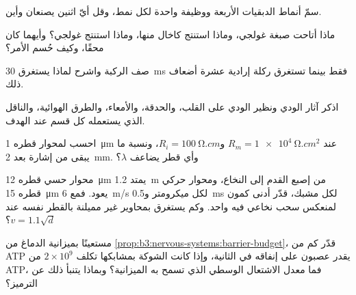 \begin{exercise}[$\star$]\label{exo:b3:nervous-systems:1}
سمّ أنماط الدبقيات الأربعة ووظيفة واحدة لكل نمط، وقل أيّ
اثنين يصنعان  وأين.
\end{exercise}

\begin{exercise}[$\star$]\label{exo:b3:nervous-systems:2}
ماذا أتاحت صبغة غولجي، وماذا استنتج كاخال منها، وماذا استنتج
غولجي؟ وأيهما كان محقًا، وكيف حُسم الأمر؟
\end{exercise}

\begin{exercise}[$\star$]\label{exo:b3:nervous-systems:3}
صف  الركبة واشرح لماذا يستغرق \qty{30}{ms} فقط
بينما تستغرق ركلة إرادية عشرة أضعاف ذلك.
\end{exercise}

\begin{exercise}[$\star$]\label{exo:b3:nervous-systems:4}
اذكر آثار الودي ونظير الودي على القلب، والحدقة، والأمعاء،
والطرق الهوائية، والناقل الذي يستعمله كل قسم عند الهدف.
\end{exercise}

\begin{exercise}[$\star\star$]\label{exo:b3:nervous-systems:5}
احسب  لمحوار قطره \qty{1}{\micro m} عند $R_{m}
= \qty{1e4}{\ohm.cm^2}$ و$R_{i} = \qty{100}{\ohm.cm}$، ونسبة
ما يبقى من إشارة بعد \qty{2}{mm}. وأي قطر يضاعف $\lambda$؟
\end{exercise}

\begin{exercise}[$\star\star$]\label{exo:b3:nervous-systems:6}
محوار حسي قطره \qty{12}{\micro m} يمتد \qty{1.2}{m} من إصبع
القدم إلى النخاع، ومحوار حركي قطره \qty{15}{\micro m} يعود.
فمع \qty{6}{m/s} لكل ميكرومتر و\qty{0.5}{ms} لكل مشبك، قدّر
أدنى كمون لمنعكس سحب نخاعي فيه  واحد. وكم يستغرق
بمحاوير غير مميلنة بالقطر نفسه عند
$v = 1.1\sqrt{d}$؟
\end{exercise}

\begin{exercise}[$\star\star$]\label{exo:b3:nervous-systems:7}
مستعينًا بميزانية الدماغ من
\cref{prop:b3:nervous-systems:barrier-budget}، قدّر كم من ATP
يقدر عصبون على إنفاقه في الثانية، وإذا كانت الشوكة بمشابكها
تكلف $2\times 10^{9}$ من ATP، فما معدل الاشتعال الوسطي الذي
تسمح به الميزانية؟ وبماذا يتنبأ ذلك عن الترميز؟
\end{exercise}

